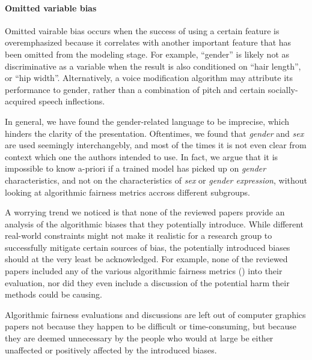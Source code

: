 \documentclass[sigconf,review,balance=false]{acmart}
\begin{document}
\paragraph*{Omitted variable bias} Omitted vairable bias occurs when the success of using a certain feature is overemphasized because it correlates with another important feature that has been omitted from the modeling stage. For example, ``gender'' is likely not as discriminative as a variable when the result is also conditioned on ``hair length'', or ``hip width''. Alternatively, a voice modification algorithm may attribute its performance to gender, rather than a combination of pitch and certain socially-acquired speech inflections. 


In general, we have found the gender-related language to be imprecise, which hinders the clarity of the presentation. Oftentimes, we found that \emph{gender} and \emph{sex} are used seemingly interchangebly, and most of the times it is not even clear from context which one the authors intended to use. In fact, we argue that it is impossible to know a-priori if a trained model has picked up on \emph{gender} characteristics, and not on the characteristics of \emph{sex} or \emph{gender expression}, without looking at algorithmic fairness metrics accross different subgroups.


A worrying trend we noticed is that none of the reviewed papers provide an analysis of the algorithmic biases that they potentially introduce. While different real-world constraints might not make it realistic for a research group to successfully mitigate certain sources of bias, the potentially introduced biases should at the very least be acknowledged. For example, none of the reviewed papers included any of the various algorithmic fairness metrics () into their evaluation, nor did they even include a discussion of the potential harm their methods could be causing.

Algorithmic fairness evaluations and discussions are left out of computer graphics papers not because they happen to be difficult or time-consuming, but because they are deemed unnecessary by the people who would at large be either unaffected or positively affected by the introduced biases.
\end{document}
